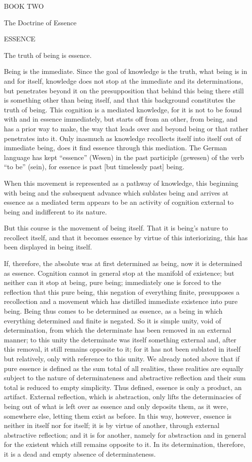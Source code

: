 
BOOK TWO

The Doctrine of Essence

ESSENCE

The truth of being is essence.

Being is the immediate.
Since the goal of knowledge is the truth,
what being is in and for itself,
knowledge does not stop at the immediate and its determinations,
but penetrates beyond it on the presupposition that
behind this being there still is something other than being itself,
and that this background constitutes the truth of being.
This cognition is a mediated knowledge,
for it is not to be found with and in essence immediately,
but starts off from an other, from being,
and has a prior way to make,
the way that leads over and beyond being
or that rather penetrates into it.
Only inasmuch as knowledge recollects
itself into itself out of immediate being,
does it find essence through this mediation.
The German language has kept “essence” (Wesen)
in the past participle (gewesen) of the verb “to be” (sein),
for essence is past [but timelessly past] being.

When this movement is represented as a pathway of knowledge,
this beginning with being and the subsequent advance
which sublates being and arrives at essence as a mediated term
appears to be an activity of cognition external to being
and indifferent to its nature.

But this course is the movement of being itself.
That it is being's nature to recollect itself,
and that it becomes essence by virtue of this interiorizing,
this has been displayed in being itself.

If, therefore, the absolute was at first determined as being,
now it is determined as essence.
Cognition cannot in general stop at the manifold of existence;
but neither can it stop at being, pure being;
immediately one is forced to the reflection that
this pure being, this negation of everything finite,
presupposes a recollection and a movement
which has distilled immediate existence into pure being.
Being thus comes to be determined as essence,
as a being in which everything determined and finite is negated.
So it is simple unity, void of determination,
from which the determinate has been removed in an external manner;
to this unity the determinate was itself something external
and, after this removal,
it still remains opposite to it;
for it has not been sublated in itself but relatively,
only with reference to this unity.
We already noted above that if pure essence is defined
as the sum total of all realities,
these realities are equally subject to
the nature of determinateness and abstractive reflection
and their sum total is reduced to empty simplicity.
Thus defined, essence is only a product, an artifact.
External reflection, which is abstraction, only lifts
the determinacies of being out of what is left over as essence
and only deposits them, as it were, somewhere else,
letting them exist as before.
In this way, however, essence is neither in itself nor for itself;
it is by virtue of another, through external abstractive reflection;
and it is for another, namely for abstraction
and in general for the existent
which still remains opposite to it.
In its determination, therefore,
it is a dead and empty absence of determinateness.

